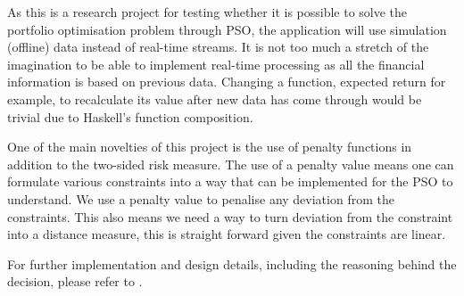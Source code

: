   As this is a research project for testing whether it is possible to solve the portfolio optimisation problem through PSO, the application will use simulation (offline) data instead of real-time streams. It is not too much a stretch of the imagination to be able to implement real-time processing as all the financial information is based on previous data. Changing a function, expected return for example, to recalculate its value after new data has come through would be trivial due to Haskell's function composition. 

  One of the main novelties of this project is the use of penalty functions in addition to the two-sided risk measure. The use of a penalty value means one can formulate various constraints into a way that can be implemented for the PSO to understand. We use a penalty value to penalise any deviation from the constraints. This also means we need a way to turn deviation from the constraint into a distance measure, this is straight forward given the constraints are linear. 

  For further implementation and design details, including the reasoning behind the decision, please refer to .

